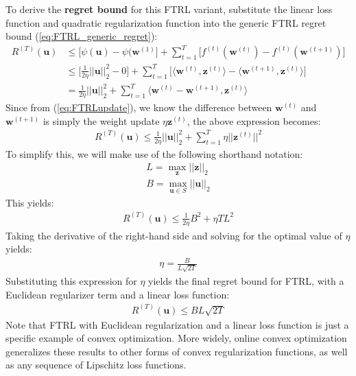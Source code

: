 \documentclass[11pt]{article}
\begin{document}
To derive the \textbf{regret bound} for this FTRL variant, substitute the linear loss function and quadratic regularization function into the generic FTRL regret bound (\ref{eq:FTRL_generic_regret}):
\begin{align}
    R^{(T)}(\boldsymbol{u}) &\leq\Big[ \psi(\boldsymbol{u}) - \psi(\boldsymbol{w}^{(1)} \Big] + \sum_{t=1}^T \Big[ f^{(t)}(\boldsymbol{w}^{(t)}) - f^{(t)}(\boldsymbol{w}^{(t+1)})\Big]\\ &\leq\Big[\frac{1}{2\eta}||\boldsymbol{u}||_2^2 - 0\Big] + \sum_{t=1}^T \Big[ \langle\boldsymbol{w}^{(t)}, \boldsymbol{z}^{(t)}\rangle - \langle\boldsymbol{w}^{(t+1)}, \boldsymbol{z}^{(t)}\rangle\Big]\\ &=\frac{1}{2\eta}||\boldsymbol{u}||^2_2 + \sum_{t=1}^T \langle\boldsymbol{w}^{(t)}-\boldsymbol{w}^{(t+1)}, \boldsymbol{z}^{(t)}\rangle
\end{align}
Since from (\ref{eq:FTRLupdate}), we know the difference between $\boldsymbol{w}^{(t)}$ and $\boldsymbol{w}^{(t+1)}$ is simply the weight update $\eta \boldsymbol{z}^{(t)}$, the above expression becomes:
\begin{align}
    R^{(T)}(\boldsymbol{u}) \leq\frac{1}{2\eta}||\boldsymbol{u}||^2_2 + \sum_{t=1}^T \eta||\boldsymbol{z}^{(t)}||^2
\end{align}
To simplify this, we will make use of the following shorthand notation:
\begin{align}
    L = \max_{\boldsymbol{z}} || \boldsymbol{z} ||_2 \\ B = \max_{\boldsymbol{u} \in S} || \boldsymbol{u} ||_2
\end{align}
This yields:
\begin{align}
    R^{(T)}(\boldsymbol{u}) \leq \frac{1}{2\eta}B^2 + \eta TL^2
\end{align}
Taking the derivative of the right-hand side and solving for the optimal value of $\eta$ yields:
\begin{align}
    \eta = \frac{B}{L\sqrt{2T}}
\end{align}
Substituting this expression for $\eta$ yields the final regret bound for FTRL, with a Euclidean regularizer term and a linear loss function:
\begin{align}
    R^{(T)}(\boldsymbol{u}) \leq BL\sqrt{2T}
\end{align}
Note that FTRL with Euclidean regularization and a linear loss function is just a specific example of convex optimization. More widely, online convex optimization generalizes these results to other forms of convex regularization functions, as well as any sequence of Lipschitz loss functions. 
\end{document}
